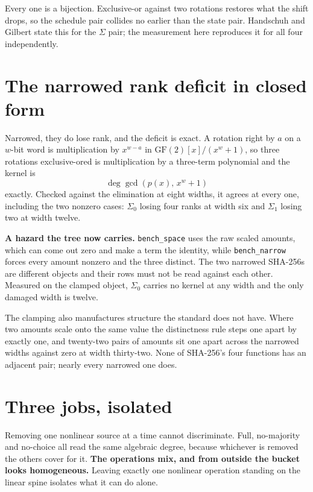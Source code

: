 Every one is a bijection. Exclusive-or against two rotations restores what the shift drops, so the schedule pair collides no earlier than the state pair. Handschuh and Gilbert state this for the \(\Sigma\) pair; the measurement here reproduces it for all four independently.

\section{The narrowed rank deficit in closed form}

Narrowed, they do lose rank, and the deficit is exact. A rotation right by \(a\) on a \(w\)-bit word is multiplication by \(x^{w-a}\) in \(\mathrm{GF}(2)[x]/(x^w + 1)\), so three rotations exclusive-ored is multiplication by a three-term polynomial and the kernel is
\[
  \deg \gcd\!\left(p(x),\, x^w + 1\right)
\]
exactly. Checked against the elimination at eight widths, it agrees at every one, including the two nonzero cases: \(\Sigma_0\) losing four ranks at width six and \(\Sigma_1\) losing two at width twelve.

\textbf{A hazard the tree now carries.} \texttt{bench\_\allowbreak{}space} uses the raw scaled amounts, which can come out zero and make a term the identity, while \texttt{bench\_\allowbreak{}narrow} forces every amount nonzero and the three distinct. The two narrowed SHA-256s are different objects and their rows must not be read against each other. Measured on the clamped object, \(\Sigma_0\) carries no kernel at any width and the only damaged width is twelve.

The clamping also manufactures structure the standard does not have. Where two amounts scale onto the same value the distinctness rule steps one apart by exactly one, and twenty-two pairs of amounts sit one apart across the narrowed widths against zero at width thirty-two. None of SHA-256's four functions has an adjacent pair; nearly every narrowed one does.

\section{Three jobs, isolated}

Removing one nonlinear source at a time cannot discriminate. Full, no-majority and no-choice all read the same algebraic degree, because whichever is removed the others cover for it. \textbf{The operations mix, and from outside the bucket looks homogeneous.} Leaving exactly one nonlinear operation standing on the linear spine isolates what it can do alone.

